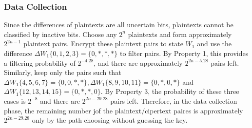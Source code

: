 \documentclass{article}
\begin{document}
\subsubsection{Data Collection}
Since the differences of plaintexts are all uncertain bits, plaintexts cannot be classified by inactive bits. Choose any $2^n$ plaintexts and form approximately $2^{2n-1}$ plaintext pairs. Encrypt these plaintext pairs to state $W_1$ and use the difference $\Delta W_1\{0, 1, 2, 3\} = \{0, \ast, \ast, \ast\}$ to filter pairs. By Property 1, this provides a filtering probability of $2^{-4.28}$, and there are approximately $2^{2n-5.28}$ pairs left. Similarly, keep only the pairs such that $\Delta W_1 \{4, 5, 6, 7\} = \{0, 0, \ast, \ast \}, \Delta W_1 \{8, 9, 10, 11\} = \{0, \ast, 0, \ast \}$ and $\Delta W_1 \{12, 13, 14, 15\} = \{0, \ast, \ast, 0\}$. By Property 3, the probability of these three cases is $2^{-8}$ and there are $2^{2n - 29.28}$ pairs left. Therefore, in the data collection phase, the remaining number jof the plaintext/cipertext paires is approximately $2^{2n - 29.28}$ only by the path choosing without guessing the key.
\end{document}
